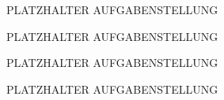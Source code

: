\newpage
\thispagestyle{empty}
\begin{minipage}[\textheight]{145mm}

\vspace{10mm}

PLATZHALTER AUFGABENSTELLUNG

\end{minipage}

\newpage
\thispagestyle{empty}
\begin{minipage}[\textheight]{145mm}

\vspace{10mm}

PLATZHALTER AUFGABENSTELLUNG

\end{minipage}

\newpage
\thispagestyle{empty}
\begin{minipage}[\textheight]{145mm}

\vspace{10mm}

PLATZHALTER AUFGABENSTELLUNG

\end{minipage}

\newpage
\thispagestyle{empty}
\begin{minipage}[\textheight]{145mm}

\vspace{10mm}

PLATZHALTER AUFGABENSTELLUNG

\end{minipage}
\cleardoublepage